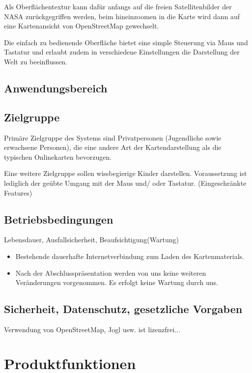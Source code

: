 \documentclass[10pt]{scrreprt}
\begin{document}
Als Oberflächentextur kann dafür anfangs auf die freien Satellitenbilder der
NASA zurückgegriffen werden, beim hineinzoomen in die Karte wird dann auf eine Kartenansicht von OpenStreetMap gewechselt.

Die einfach zu bedienende Oberfläche bietet eine simple Steuerung via Maus und Tastatur und erlaubt zudem in verschiedene Einstellungen die Darstellung der Welt zu beeinflussen. 


\section{Anwendungsbereich}


\section{Zielgruppe}
Primäre Zielgruppe des Systems sind Privatpersonen (Jugendliche sowie erwachsene Personen), die eine andere Art der Kartendarstellung als die typischen Onlinekarten bevorzugen.

Eine weitere Zielgruppe sollen wissbegierige Kinder darstellen. Voraussetzung ist lediglich der geübte Umgang mit der Maus und/ oder Tastatur. (Eingeschränkte Features)

\section{Betriebsbedingungen}
Lebensdauer, Ausfallsicherheit, Beaufsichtigung(Wartung)

\begin{itemize}
\item Bestehende dauerhafte Internetverbindung zum Laden des Kartenmaterials.
\item Nach  der  Abschlusspräsentation  werden  von  uns  keine  weiteren 
Veränderungen vorgenommen. Es erfolgt keine Wartung durch uns.
\end{itemize} 

\section{Sicherheit, Datenschutz, gesetzliche Vorgaben}
Verwendung von OpenStreetMap, Jogl usw. ist lizenzfrei...




\chapter{Produktfunktionen}
\end{document}
